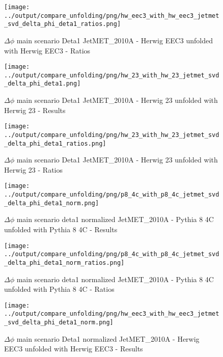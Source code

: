 \documentclass[11pt]{book}
\begin{document}
\begin{figure}[ht]
\centering
\texttt{[image: ../output/compare\_unfolding/png/hw\_eec3\_with\_hw\_eec3\_jetmet\_svd\_delta\_phi\_deta1\_ratios.png]}
\caption{$\Delta\phi$ main scenario Deta1 JetMET\_2010A - Herwig EEC3 unfolded with Herwig EEC3 - Ratios}
\label{hw_eec3_hw_eec3_jetmet_svd_delta_phi_deta1_b}
\end{figure}

\begin{figure}[ht]
\centering
\texttt{[image: ../output/compare\_unfolding/png/hw\_23\_with\_hw\_23\_jetmet\_svd\_delta\_phi\_deta1.png]}
\caption{$\Delta\phi$ main scenario Deta1 JetMET\_2010A - Herwig 23 unfolded with Herwig 23 - Results}
\label{hw_23_hw_23_jetmet_svd_delta_phi_deta1_a}
\end{figure}

\begin{figure}[ht]
\centering
\texttt{[image: ../output/compare\_unfolding/png/hw\_23\_with\_hw\_23\_jetmet\_svd\_delta\_phi\_deta1\_ratios.png]}
\caption{$\Delta\phi$ main scenario Deta1 JetMET\_2010A - Herwig 23 unfolded with Herwig 23 - Ratios}
\label{hw_23_hw_23_jetmet_svd_delta_phi_deta1_b}
\end{figure}

\begin{figure}[ht]
\centering
\texttt{[image: ../output/compare\_unfolding/png/p8\_4c\_with\_p8\_4c\_jetmet\_svd\_delta\_phi\_deta1\_norm.png]}
\caption{$\Delta\phi$ main scenario deta1 normalized JetMET\_2010A - Pythia 8 4C unfolded with Pythia 8 4C - Results}
\label{p8_p8_jetmet_svd_delta_phi_deta1_norm_a}
\end{figure}

\begin{figure}[ht]
\centering
\texttt{[image: ../output/compare\_unfolding/png/p8\_4c\_with\_p8\_4c\_jetmet\_svd\_delta\_phi\_deta1\_norm\_ratios.png]}
\caption{$\Delta\phi$ main scenario deta1 normalized JetMET\_2010A - Pythia 8 4C unfolded with Pythia 8 4C - Ratios}
\label{p8_p8_jetmet_svd_delta_phi_deta1_norm_b}
\end{figure}

\begin{figure}[ht]
\centering
\texttt{[image: ../output/compare\_unfolding/png/hw\_eec3\_with\_hw\_eec3\_jetmet\_svd\_delta\_phi\_deta1\_norm.png]}
\caption{$\Delta\phi$ main scenario Deta1 normalized JetMET\_2010A - Herwig EEC3 unfolded with Herwig EEC3 - Results}
\label{hw_eec3_hw_eec3_jetmet_svd_delta_phi_deta1_norm_a}
\end{figure}
\end{document}
